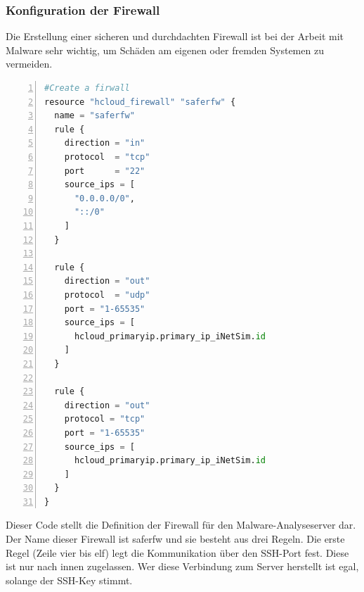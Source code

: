 \begin{otherlanguage}{ngerman}
\subsubsection{Konfiguration der Firewall}
Die Erstellung einer sicheren und durchdachten Firewall ist bei der Arbeit mit Malware sehr wichtig, um Schäden am eigenen oder fremden Systemen zu vermeiden. 
\newline
\newline
\tt
\begin{lstlisting}[caption = Konfiguration der Firewall für den Analyseserver, language=python, numbers=left, numberstyle=\tiny]
#Create a firwall
resource "hcloud_firewall" "saferfw" {
  name = "saferfw"
  rule {
    direction = "in"
    protocol  = "tcp"
    port      = "22"
    source_ips = [
      "0.0.0.0/0",
      "::/0"
    ]
  }

  rule {
    direction = "out"
    protocol  = "udp"
    port = "1-65535"
    source_ips = [
      hcloud_primaryip.primary_ip_iNetSim.id
    ]
  }

  rule {
    direction = "out"
    protocol = "tcp"
    port = "1-65535"
    source_ips = [
      hcloud_primaryip.primary_ip_iNetSim.id
    ]
  }
}
\end{lstlisting}
\rm
Dieser Code stellt die Definition der Firewall für den Malware-Analyseserver dar. Der Name dieser Firewall ist \dq saferfw \dq{} und sie besteht aus drei Regeln. Die erste Regel (Zeile vier bis elf) legt die Kommunikation über den SSH-Port fest. Diese ist nur nach innen zugelassen. Wer diese Verbindung zum Server herstellt ist egal, solange der SSH-Key stimmt. 

\end{otherlanguage}
